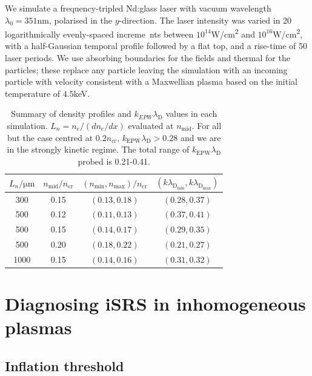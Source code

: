 We simulate a frequency-tripled Nd:glass laser with vacuum wavelength $\lambda_0 = 351\si{\nano\metre}$, polarised in the $y$-direction. The laser intensity was varied in 20 logarithmically evenly-spaced increme\
nts between $10^{14}$\si{W/\centi\metre^2} and $10^{16}$\si{W/\centi\metre^2}, with a half-Gaussian temporal profile followed by a flat top, and a rise-time of 50 laser periods.
We use absorbing boundaries for the fields and thermal for the particles; these replace any particle leaving the
simulation with an incoming particle with velocity consistent with a Maxwellian plasma based on the initial temperature of $4.5$\si{keV}.

\begin{table}[ht]
    \caption{\label{tab:densities}
        Summary of density profiles and $k_{EPW}\lambda_\mathrm{D}$ values in each simulation. $L_n=n_e/(dn_e/dx)$ evaluated at $n_\mathrm{mid}$. For all but the case centred at $0.2n_\mathrm{cr}$, $k_\mathrm{EPW}\lambda_\mathrm{D} > 0.28$ and we are in the strongly kinetic regime. The total range of $k_\mathrm{EPW}\lambda_\mathrm{D}$ probed is 0.21-0.41.
        }
    \begin{center}
    \begin{tabular}{|c|c|c|c|}
    $L_n/\si{\micro \metre}$  & $n_\mathrm{mid}/n_\mathrm{cr}$ & $(n_\mathrm{min},n_\mathrm{max})/n_\mathrm{cr}$ &$(k\lambda_\mathrm{D_{min}},k\lambda_\mathrm{D_{max}})$\\
    \hline
    300& 0.15  & $(0.13,0.18)$ & $(0.28,0.37)$\\
    500 & 0.12 &$(0.11,0.13)$ & $(0.37,0.41)$\\
    500 & 0.15 & $(0.14,0.17)$& $(0.29,0.35)$ \\
    500 & 0.20 & $(0.18,0.22)$& $(0.21,0.27)$\\
    1000 & 0.15 & $(0.14,0.16)$ & $(0.31,0.32)$ \\
    \end{tabular}
    \end{center}
\end{table}

\section{Diagnosing iSRS in inhomogeneous plasmas}\label{sec:signatures}
\subsection{Inflation threshold}

